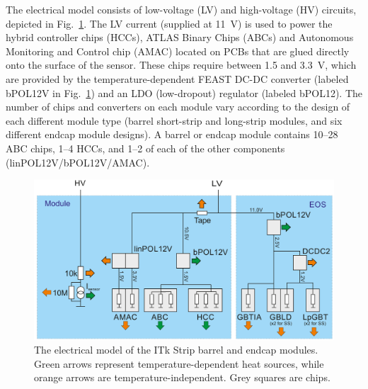 
The electrical model consists of low-voltage (LV) and high-voltage (HV) circuits, depicted in
Fig.~\ref{electrical_model}. The LV current (supplied at 11~V) is used to power the hybrid controller chips (HCCs),
ATLAS Binary Chips (ABCs) and Autonomous Monitoring and Control chip (AMAC) located on PCBs that are
glued directly onto the surface of the sensor.
These chips require between 1.5 and 3.3~V, which are provided by the temperature-dependent
FEAST DC-DC converter (labeled bPOL12V in Fig.~\ref{electrical_model}) and an LDO (low-dropout) regulator (labeled bPOL12).
The number of chips and converters on each module vary according to the design of
each different module type (barrel short-strip and long-strip modules, and six different endcap
module designs).
A barrel or endcap module contains 10--28 ABC chips, 1--4 HCCs, and
1--2 of each of the other components (linPOL12V/bPOL12V/AMAC).

\begin{figure}[ht!]
\centering
\includegraphics[width=0.8\linewidth]{figures/electrical_model.pdf}
\caption{
The electrical model of the ITk Strip barrel and endcap modules. Green arrows represent temperature-dependent heat sources, while orange arrows are temperature-independent. Grey squares are chips.
}
\label{electrical_model}
\end{figure}



